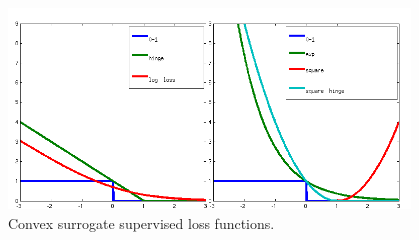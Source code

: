\begin{figure}[tb]
\begin{center}
\includegraphics[width=0.95\textwidth]{figs/losses.png}
\caption[Convex surrogate supervised loss functions.]{Convex surrogate supervised loss functions.}
\label{fig:surrogates}
\end{center}
\end{figure}

